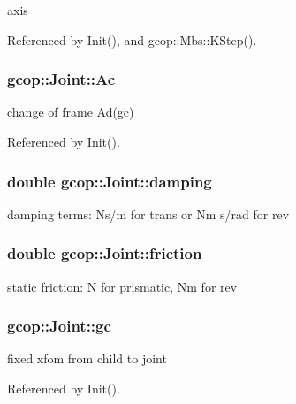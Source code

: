 axis 



\-Referenced by \-Init(), and gcop\-::\-Mbs\-::\-K\-Step().

\subsubsection[{\-Ac}]{ {\bf gcop\-::\-Joint\-::\-Ac}}\label{classgcop_1_1Joint_ae41a13299ca2304e7ffd99935d1f3492}


change of frame \-Ad(gc) 



\-Referenced by \-Init().

\subsubsection[{damping}]{\setlength{\rightskip}{0pt plus 5cm}double {\bf gcop\-::\-Joint\-::damping}}\label{classgcop_1_1Joint_a5f06aeea2b1386a9b92e3191cc2ffbfd}


damping terms\-: \-Ns/m for trans or \-Nm s/rad for rev 

\subsubsection[{friction}]{\setlength{\rightskip}{0pt plus 5cm}double {\bf gcop\-::\-Joint\-::friction}}\label{classgcop_1_1Joint_ac0ba80740559bff26a8efed067f49c0b}


static friction\-: \-N for prismatic, \-Nm for rev 

\subsubsection[{gc}]{ {\bf gcop\-::\-Joint\-::gc}}\label{classgcop_1_1Joint_aa272c4acc42a5a662698b405674ba150}


fixed xfom from child to joint 



\-Referenced by \-Init().

